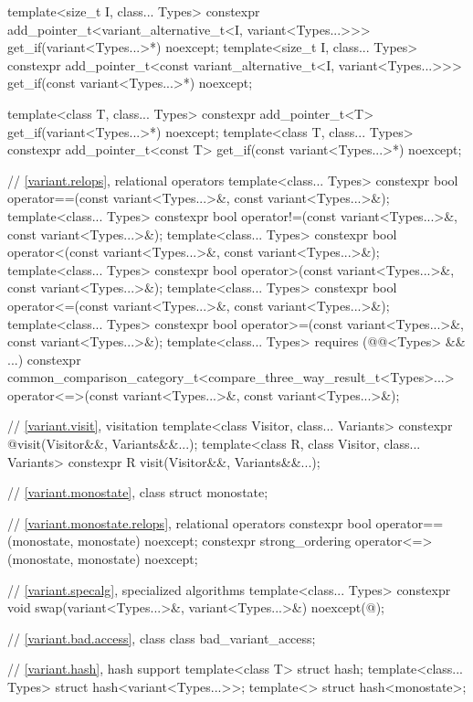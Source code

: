\begin{codeblock}
{  template<size_t I, class... Types>
    constexpr add_pointer_t<variant_alternative_t<I, variant<Types...>>>
      get_if(variant<Types...>*) noexcept;
  template<size_t I, class... Types>
    constexpr add_pointer_t<const variant_alternative_t<I, variant<Types...>>>
      get_if(const variant<Types...>*) noexcept;

  template<class T, class... Types>
    constexpr add_pointer_t<T>
      get_if(variant<Types...>*) noexcept;
  template<class T, class... Types>
    constexpr add_pointer_t<const T>
      get_if(const variant<Types...>*) noexcept;

  // \ref{variant.relops}, relational operators
  template<class... Types>
    constexpr bool operator==(const variant<Types...>&, const variant<Types...>&);
  template<class... Types>
    constexpr bool operator!=(const variant<Types...>&, const variant<Types...>&);
  template<class... Types>
    constexpr bool operator<(const variant<Types...>&, const variant<Types...>&);
  template<class... Types>
    constexpr bool operator>(const variant<Types...>&, const variant<Types...>&);
  template<class... Types>
    constexpr bool operator<=(const variant<Types...>&, const variant<Types...>&);
  template<class... Types>
    constexpr bool operator>=(const variant<Types...>&, const variant<Types...>&);
  template<class... Types> requires (@@<Types> && ...)
    constexpr common_comparison_category_t<compare_three_way_result_t<Types>...>
      operator<=>(const variant<Types...>&, const variant<Types...>&);

  // \ref{variant.visit}, visitation
  template<class Visitor, class... Variants>
    constexpr @\seebelow@ visit(Visitor&&, Variants&&...);
  template<class R, class Visitor, class... Variants>
    constexpr R visit(Visitor&&, Variants&&...);

  // \ref{variant.monostate}, class 
  struct monostate;

  // \ref{variant.monostate.relops},  relational operators
  constexpr bool operator==(monostate, monostate) noexcept;
  constexpr strong_ordering operator<=>(monostate, monostate) noexcept;

  // \ref{variant.specalg}, specialized algorithms
  template<class... Types>
    constexpr void swap(variant<Types...>&, variant<Types...>&) noexcept(@\seebelow@);

  // \ref{variant.bad.access}, class 
  class bad_variant_access;

  // \ref{variant.hash}, hash support
  template<class T> struct hash;
  template<class... Types> struct hash<variant<Types...>>;
  template<> struct hash<monostate>;
}
\end{codeblock}

